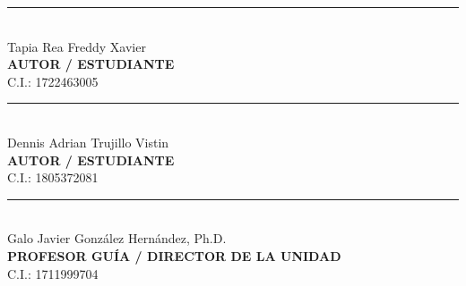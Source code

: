 \vspace{1.8cm}

\noindent
\begin{minipage}[t]{0.45\linewidth}
    \centering
    \rule{5.8cm}{0.4pt} \\[0.2cm]
    Tapia Rea Freddy Xavier \\
    \textbf{AUTOR / ESTUDIANTE} \\
    C.I.: 1722463005
\end{minipage}%
\hfill
\begin{minipage}[t]{0.45\linewidth}
    \centering
    \rule{5.8cm}{0.4pt} \\[0.2cm]
    Dennis Adrian Trujillo Vistin \\
    \textbf{AUTOR / ESTUDIANTE} \\
    C.I.: 1805372081
\end{minipage}

\vspace{2.0cm}

\begin{center}
    \begin{minipage}[t]{0.55\linewidth}
        \centering
        \rule{6.5cm}{0.4pt} \\[0.2cm]
        Galo Javier González Hernández, Ph.D. \\
        \textbf{PROFESOR GUÍA / DIRECTOR DE LA UNIDAD} \\
        C.I.: 1711999704
    \end{minipage}
\end{center}

\newpage
